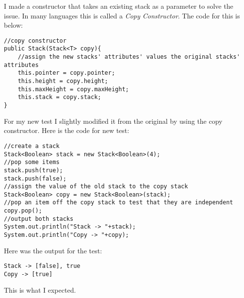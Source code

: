 \documentclass[../../../../../main.tex]{subfiles}
\begin{document}
\newpage
\noindent
I made a constructor that takes an existing stack as a parameter to solve the issue. In many languages this is called a \textit{Copy Constructor}. The code for this is below:
\begin{verbatim}
//copy constructor
public Stack(Stack<T> copy){
	//assign the new stacks' attributes' values the original stacks' attributes
	this.pointer = copy.pointer;
	this.height = copy.height;
	this.maxHeight = copy.maxHeight;
	this.stack = copy.stack;
}
\end{verbatim}
For my new test I slightly modified it from the original by using the copy constructor. Here is the code for new test:
\begin{verbatim}
//create a stack
Stack<Boolean> stack = new Stack<Boolean>(4);
//pop some items
stack.push(true);
stack.push(false);
//assign the value of the old stack to the copy stack 
Stack<Boolean> copy = new Stack<Boolean>(stack);
//pop an item off the copy stack to test that they are independent
copy.pop();
//output both stacks
System.out.println("Stack -> "+stack);
System.out.println("Copy -> "+copy);
\end{verbatim}
Here was the output for the test:
\begin{verbatim}
Stack -> [false], true
Copy -> [true]
\end{verbatim}
This is what I expected.
\newpage
\end{document}
